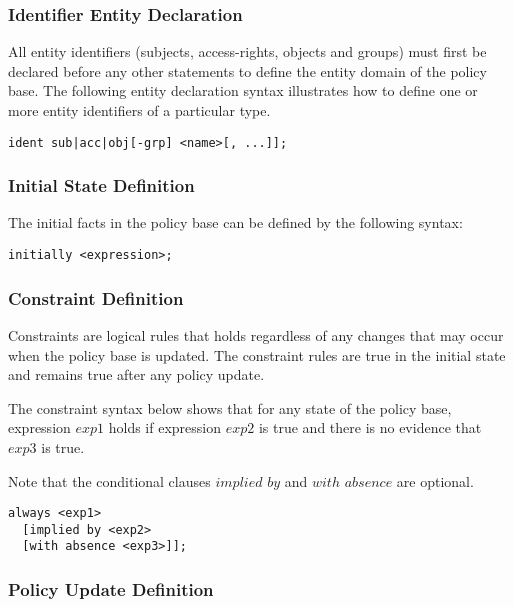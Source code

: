 \documentclass[10pt, twocolumn]{article}
\begin{document}
      \subsubsection{Identifier Entity Declaration}

        All entity identifiers (subjects, access-rights, objects and groups)
        must first be declared before any other statements to define the
        entity domain of the policy base. The following entity declaration
        syntax illustrates how to define one or more entity identifiers of a
        particular type.

        \begin{verbatim}ident sub|acc|obj[-grp] <name>[, ...]];\end{verbatim}

      \subsubsection{Initial State Definition}

        The initial facts in the policy base can be defined by the following
        syntax:

        \begin{verbatim}initially <expression>;\end{verbatim}

      \subsubsection{Constraint Definition}

        Constraints are logical rules that holds regardless of any changes
        that may occur when the policy base is updated. The constraint rules
        are true in the initial state and remains true after any policy update.

        The constraint syntax below shows that for any state of the policy
        base, expression $exp1$ holds if expression $exp2$ is true and there
        is no evidence that $exp3$ is true.

        Note that the conditional clauses $implied$ $by$ and $with$ $absence$
        are optional.

\begin{verbatim}
always <exp1>
  [implied by <exp2>
  [with absence <exp3>]];
\end{verbatim}

      \subsubsection{Policy Update Definition}
\end{document}
